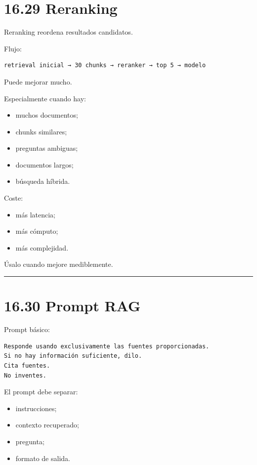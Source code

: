 \section{16.29 Reranking}\label{reranking-1}

Reranking reordena resultados candidatos.

Flujo:

\begin{lstlisting}
retrieval inicial → 30 chunks → reranker → top 5 → modelo
\end{lstlisting}

Puede mejorar mucho.

Especialmente cuando hay:

\begin{itemize}
\tightlist
\item
  muchos documentos;
\item
  chunks similares;
\item
  preguntas ambiguas;
\item
  documentos largos;
\item
  búsqueda híbrida.
\end{itemize}

Coste:

\begin{itemize}
\tightlist
\item
  más latencia;
\item
  más cómputo;
\item
  más complejidad.
\end{itemize}

Úsalo cuando mejore mediblemente.

\begin{center}\rule{0.5\linewidth}{0.5pt}\end{center}

\section{16.30 Prompt RAG}\label{prompt-rag}

Prompt básico:

\begin{lstlisting}
Responde usando exclusivamente las fuentes proporcionadas.
Si no hay información suficiente, dilo.
Cita fuentes.
No inventes.
\end{lstlisting}

El prompt debe separar:

\begin{itemize}
\tightlist
\item
  instrucciones;
\item
  contexto recuperado;
\item
  pregunta;
\item
  formato de salida.
\end{itemize}

